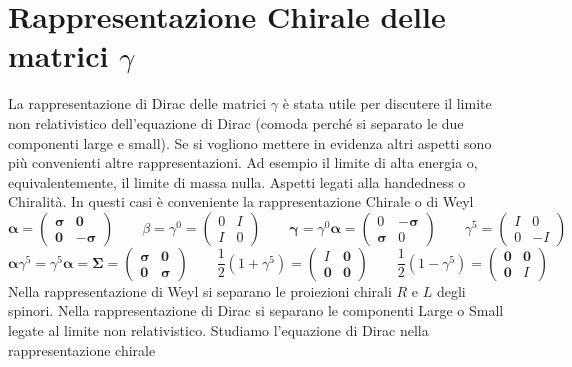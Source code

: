 \section{Rappresentazione Chirale delle matrici $\gamma$}
La rappresentazione di Dirac delle matrici $\gamma$ è stata utile per discutere il limite non relativistico dell'equazione di Dirac (comoda perché si separato le due componenti large e small). Se si vogliono mettere in evidenza altri aspetti sono più convenienti altre rappresentazioni. Ad esempio il limite di alta energia o, equivalentemente, il limite di massa nulla. Aspetti legati alla handedness o Chiralità. In questi casi è conveniente la rappresentazione Chirale o di Weyl
$$
\boldsymbol{\alpha} = \begin{pmatrix} \boldsymbol{\sigma} & \mathbf{0} \\ \mathbf{0} & -\boldsymbol{\sigma} \end{pmatrix} \qquad \beta = \gamma^0 = \begin{pmatrix} 0 & I \\ I & 0 \end{pmatrix} \qquad \boldsymbol{\gamma} = \gamma^0\boldsymbol{\alpha} = \begin{pmatrix} 0 & -\boldsymbol{\sigma} \\ \boldsymbol{\sigma} & 0 \end{pmatrix} \qquad \gamma^5 = \begin{pmatrix} I & 0 \\ 0 & -I \end{pmatrix}
$$
$$
\boldsymbol{\alpha}\gamma^5 = \gamma^5\boldsymbol{\alpha} = \boldsymbol{\Sigma} = \begin{pmatrix} \boldsymbol{\sigma} & \mathbf{0} \\ \mathbf{0} & \boldsymbol{\sigma} \end{pmatrix} \qquad \frac{1}{2}(1 + \gamma^5) = \begin{pmatrix} I & \mathbf{0} \\ \mathbf{0} & \mathbf{0} \end{pmatrix} \qquad \frac{1}{2}(1 - \gamma^5) = \begin{pmatrix} \mathbf{0} & \mathbf{0} \\ \mathbf{0} & I \end{pmatrix}
$$
Nella rappresentazione di Weyl si separano le proiezioni chirali $R$ e $L$ degli spinori. Nella rappresentazione di Dirac si separano le componenti Large o Small legate al limite non relativistico. Studiamo l'equazione di Dirac nella rappresentazione chirale
